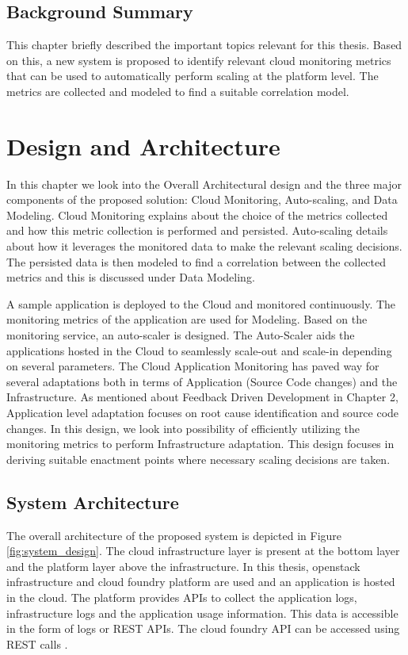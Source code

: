 \documentclass[article,type=msc,colorback,12pt,accentcolor=tud8b,table]{tudthesis}
\begin{document}
\subsection{Background Summary}
This chapter briefly described the important topics relevant for this thesis. Based on this, a new system is proposed to identify relevant cloud monitoring metrics that can be used to automatically perform scaling at the platform level. The metrics are collected and modeled to find a suitable correlation model.
	
 \cleardoublepage

 \hfill 
 \section{Design and Architecture}	
 \hfill \break
 
 In this chapter we look into the Overall Architectural design and the three major components of the proposed solution: Cloud Monitoring, Auto-scaling, and Data Modeling. Cloud Monitoring explains about the choice of the metrics collected and how this metric collection is performed and persisted. Auto-scaling details about how it leverages the monitored data to make the relevant scaling decisions. The persisted data is then modeled to find a correlation between the collected metrics and this is discussed under Data Modeling. 
 
 	A sample application is deployed to the Cloud and monitored continuously. The monitoring metrics of the application are used for Modeling. Based on the monitoring service, an auto-scaler is designed. The Auto-Scaler aids the applications hosted in the Cloud to seamlessly scale-out and scale-in depending on several parameters. The Cloud Application Monitoring has paved way for several adaptations both in terms of Application (Source Code changes) and the Infrastructure. As mentioned about Feedback Driven Development in Chapter 2, Application level adaptation focuses on root cause identification and source code changes. In this design, we look into possibility of efficiently utilizing the monitoring metrics to perform Infrastructure adaptation.  This design focuses in deriving suitable enactment points where necessary scaling decisions are taken. 
 
\subsection{System Architecture} 

	The overall architecture of the proposed system is depicted in Figure \ref{fig:system_design}. The cloud infrastructure layer is present at the bottom layer and the platform layer above the infrastructure. In this thesis, openstack infrastructure and cloud foundry platform are used and an application is hosted in the cloud. The platform provides APIs to collect the application logs, infrastructure logs and the application usage information. This data is accessible in the form of logs or REST APIs. The cloud foundry API can be accessed using REST calls \cite{cf_summary}. 
	
\end{document}
